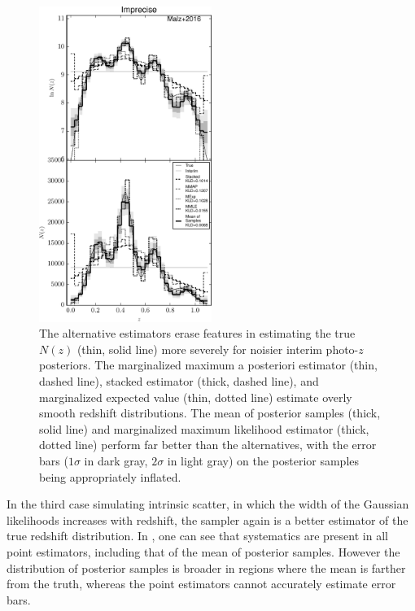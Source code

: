 \begin{figure}
	\includegraphics[width=0.5\textwidth]{figures/chippr/sig4_comps.pdf}
	\caption{The alternative estimators erase features in estimating the true $N(z)$ (thin, solid line) more severely for noisier interim photo-$z$ posteriors.  
		The marginalized maximum a posteriori estimator (thin, dashed line), stacked estimator (thick, dashed line), and marginalized expected value (thin, dotted line) estimate overly smooth redshift distributions.  
		The mean of posterior samples (thick, solid line) and marginalized maximum likelihood estimator (thick, dotted line) perform far better than the alternatives, with the error bars ($1\sigma$ in dark gray, $2\sigma$ in light gray) on the posterior samples being appropriately inflated.}
\end{figure}

In the third case simulating intrinsic scatter, in which the width of the Gaussian likelihoods increases with redshift, the sampler again is a better estimator of the true redshift distribution.  
In , one can see that systematics are present in all point estimators, including that of the mean of posterior samples.  
However the distribution of posterior samples is broader in regions where the mean is farther from the truth, whereas the point estimators cannot accurately estimate error bars.

